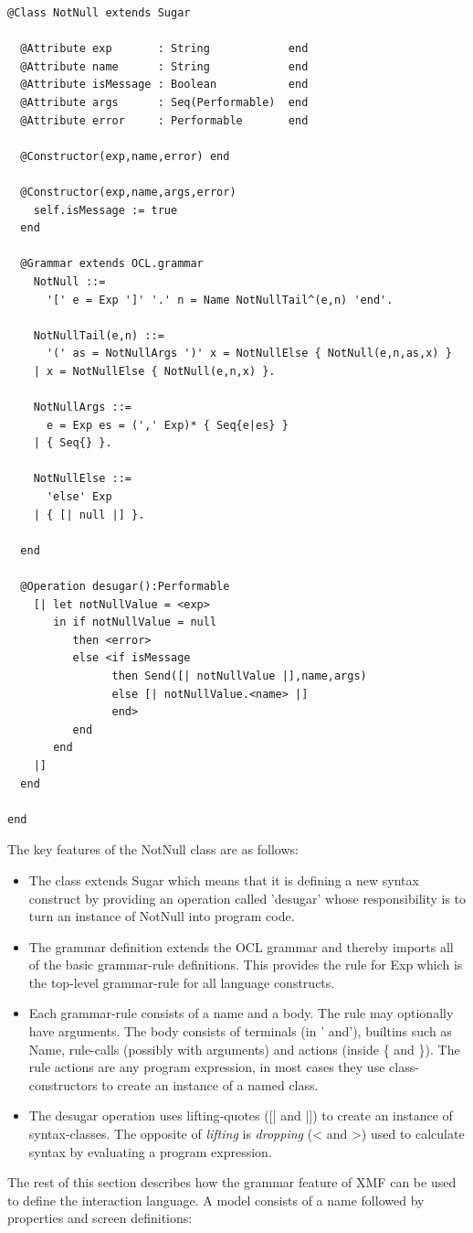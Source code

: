 \newpage{}

\begin{lstlisting}
@Class NotNull extends Sugar

  @Attribute exp       : String            end
  @Attribute name      : String            end
  @Attribute isMessage : Boolean           end
  @Attribute args      : Seq(Performable)  end
  @Attribute error     : Performable       end
    
  @Constructor(exp,name,error) end
    
  @Constructor(exp,name,args,error) 
    self.isMessage := true
  end
    
  @Grammar extends OCL.grammar
    NotNull ::= 
      '[' e = Exp ']' '.' n = Name NotNullTail^(e,n) 'end'.
      
    NotNullTail(e,n) ::= 
      '(' as = NotNullArgs ')' x = NotNullElse { NotNull(e,n,as,x) }
    | x = NotNullElse { NotNull(e,n,x) }.
      
    NotNullArgs ::=
      e = Exp es = (',' Exp)* { Seq{e|es} }
    | { Seq{} }.
      
    NotNullElse ::=
      'else' Exp 
    | { [| null |] }.
      
  end
    
  @Operation desugar():Performable
    [| let notNullValue = <exp>
       in if notNullValue = null
          then <error>
          else <if isMessage
                then Send([| notNullValue |],name,args)
                else [| notNullValue.<name> |]
                end>
          end
       end
    |]
  end
    
end
\end{lstlisting}The key features of the NotNull class are as follows:

\begin{itemize}
\item The class extends Sugar which means that it is defining a new syntax
construct by providing an operation called 'desugar' whose responsibility
is to turn an instance of NotNull into program code.
\item The grammar definition extends the OCL grammar and thereby imports
all of the basic grammar-rule definitions. This provides the rule
for Exp which is the top-level grammar-rule for all language constructs.
\item Each grammar-rule consists of a name and a body. The rule may optionally
have arguments. The body consists of terminals (in ' and'), builtins
such as Name, rule-calls (possibly with arguments) and actions (inside
\{ and \}). The rule actions are any program expression, in most cases
they use class-constructors to create an instance of a named class.
\item The desugar operation uses lifting-quotes ({[}| and |]) to create
an instance of syntax-classes. The opposite of \emph{lifting} is \emph{dropping}
(< and >) used to calculate syntax by evaluating a program expression.
\end{itemize}
The rest of this section describes how the grammar feature of XMF
can be used to define the interaction language. A model consists of
a name followed by properties and screen definitions:

